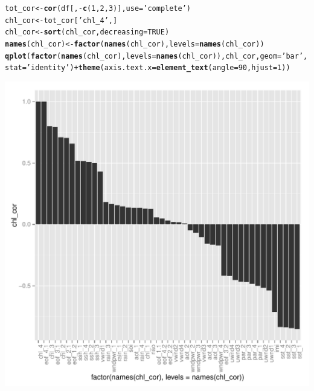 \documentclass{article}\usepackage[]{graphicx}\usepackage[]{color}
\makeatletter
\def\maxwidth{ %
  \ifdim\Gin@nat@width>\linewidth
    \linewidth
  \else
    \Gin@nat@width
  \fi
}
\newcommand{\hlnum}[1]{\textcolor[rgb]{0.686,0.059,0.569}{#1}}%
\newcommand{\hlstr}[1]{\textcolor[rgb]{0.192,0.494,0.8}{#1}}%
\newcommand{\hlopt}[1]{\textcolor[rgb]{0,0,0}{#1}}%
\newcommand{\hlstd}[1]{\textcolor[rgb]{0.345,0.345,0.345}{#1}}%
\newcommand{\hlkwb}[1]{\textcolor[rgb]{0.69,0.353,0.396}{#1}}%
\newcommand{\hlkwc}[1]{\textcolor[rgb]{0.333,0.667,0.333}{#1}}%
\newcommand{\hlkwd}[1]{\textcolor[rgb]{0.737,0.353,0.396}{\textbf{#1}}}%
\newenvironment{kframe}{%
 \def\at@end@of@kframe{}%
 \ifinner\ifhmode%
  \def\at@end@of@kframe{\end{minipage}}%
  \begin{minipage}{\columnwidth}%
 \fi\fi%
 \def\FrameCommand##1{\hskip\@totalleftmargin \hskip-\fboxsep
 \colorbox{shadecolor}{##1}\hskip-\fboxsep
     \hskip-\linewidth \hskip-\@totalleftmargin \hskip\columnwidth}%
 \MakeFramed {\advance\hsize-\width
   \@totalleftmargin\z@ \linewidth\hsize
   \@setminipage}}%
 {\par\unskip\endMakeFramed%
 \at@end@of@kframe}
\newenvironment{knitrout}{}{} %
\makeatother
\begin{document}
\begin{knitrout}
\color{fgcolor}\begin{kframe}
\begin{alltt}
\hlstd{tot_cor} \hlkwb{<-} \hlkwd{cor}\hlstd{(df[,}\hlopt{-}\hlkwd{c}\hlstd{(}\hlnum{1}\hlstd{,}\hlnum{2}\hlstd{,}\hlnum{3}\hlstd{)],} \hlkwc{use}\hlstd{=}\hlstr{'complete'}\hlstd{)}
\hlstd{chl_cor} \hlkwb{<-} \hlstd{tot_cor[}\hlstr{'chl_4'}\hlstd{,]}
\hlstd{chl_cor} \hlkwb{<-} \hlkwd{sort}\hlstd{(chl_cor,} \hlkwc{decreasing}\hlstd{=}\hlnum{TRUE}\hlstd{)}
\hlkwd{names}\hlstd{(chl_cor)} \hlkwb{<-} \hlkwd{factor}\hlstd{(}\hlkwd{names}\hlstd{(chl_cor),} \hlkwc{levels}\hlstd{=}\hlkwd{names}\hlstd{(chl_cor))}
\hlkwd{qplot}\hlstd{(}\hlkwd{factor}\hlstd{(}\hlkwd{names}\hlstd{(chl_cor),} \hlkwc{levels}\hlstd{=}\hlkwd{names}\hlstd{(chl_cor)), chl_cor,} \hlkwc{geom}\hlstd{=}\hlstr{'bar'}\hlstd{,} \hlkwc{stat}\hlstd{=}\hlstr{'identity'}\hlstd{)} \hlopt{+} \hlkwd{theme}\hlstd{(}\hlkwc{axis.text.x} \hlstd{=} \hlkwd{element_text}\hlstd{(}\hlkwc{angle} \hlstd{=} \hlnum{90}\hlstd{,} \hlkwc{hjust} \hlstd{=} \hlnum{1}\hlstd{))}
\end{alltt}


{\ttfamily\noindent\color{warningcolor}{\#\# Warning: Stacking not well defined when ymin != 0}}\end{kframe}
\includegraphics[width=\maxwidth]{figure/unnamed-chunk-36-1} 

\end{knitrout}
\end{document}
